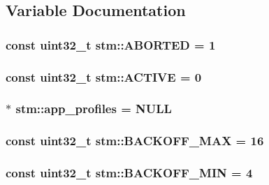 \subsection{Variable Documentation}
\hypertarget{namespacestm_aac91219d15a450587c7cbb52db4b13fd}{
\subsubsection[{A\-B\-O\-R\-T\-E\-D}]{\setlength{\rightskip}{0pt plus 5cm}const uint32\-\_\-t stm\-::\-A\-B\-O\-R\-T\-E\-D = 1\hspace{0.3cm}{\ttfamily [static]}}}\label{namespacestm_aac91219d15a450587c7cbb52db4b13fd}
\hypertarget{namespacestm_adf9ac55b7a24ef9715c8e425928b580b}{
\subsubsection[{A\-C\-T\-I\-V\-E}]{\setlength{\rightskip}{0pt plus 5cm}const uint32\-\_\-t stm\-::\-A\-C\-T\-I\-V\-E = 0\hspace{0.3cm}{\ttfamily [static]}}}\label{namespacestm_adf9ac55b7a24ef9715c8e425928b580b}
\hypertarget{namespacestm_a067ff48e3e80f9f2ee75df5b1156827b}{
\subsubsection[{app\-\_\-profiles}]{ $\ast$ stm\-::app\-\_\-profiles = N\-U\-L\-L}}\label{namespacestm_a067ff48e3e80f9f2ee75df5b1156827b}
\hypertarget{namespacestm_a998e4e0c954ef37eefab31f44ff016d7}{
\subsubsection[{B\-A\-C\-K\-O\-F\-F\-\_\-\-M\-A\-X}]{\setlength{\rightskip}{0pt plus 5cm}const uint32\-\_\-t stm\-::\-B\-A\-C\-K\-O\-F\-F\-\_\-\-M\-A\-X = 16\hspace{0.3cm}{\ttfamily [static]}}}\label{namespacestm_a998e4e0c954ef37eefab31f44ff016d7}
\hypertarget{namespacestm_a5db105c525a0fc1848a80d674c441052}{
\subsubsection[{B\-A\-C\-K\-O\-F\-F\-\_\-\-M\-I\-N}]{\setlength{\rightskip}{0pt plus 5cm}const uint32\-\_\-t stm\-::\-B\-A\-C\-K\-O\-F\-F\-\_\-\-M\-I\-N = 4\hspace{0.3cm}{\ttfamily [static]}}}\label{namespacestm_a5db105c525a0fc1848a80d674c441052}
